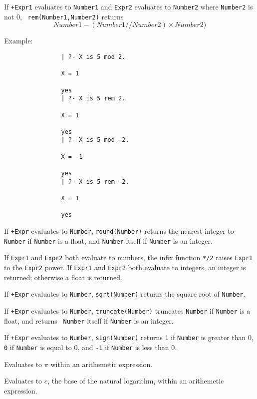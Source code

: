 \begin{description}
%
If {\tt +Expr1} evaluates to {\tt Number1} and {\tt Expr2} evaluates
to {\tt Number2} where {\tt Number2} is not 0, {\tt
rem(Number1,Number2)} returns
\[
	Number1 - ({Number1} // {Number2}) \times Number2)
\]

    Example:
    {\footnotesize
     \begin{verbatim}
                | ?- X is 5 mod 2.

                X = 1

                yes
                | ?- X is 5 rem 2.

                X = 1

                yes
                | ?- X is 5 mod -2.

                X = -1

                yes
                | ?- X is 5 rem -2.

                X = 1

                yes
  \end{verbatim}}

%
If {\tt +Expr} evaluates to {\tt Number}, {\tt round(Number)} returns
the nearest integer to {\tt Number} if {\tt Number} is a float, and
{\tt Number} itself if {\tt Number} is an integer.

%
If {\tt Expr1} and {\tt Expr2} both evaluate to numbers, the infix
function {\tt **/2} raises {\tt Expr1} to the {\tt Expr2} power.  If
{\tt Expr1} and {\tt Expr2} both evaluate to integers, an integer is
returned; otherwise a float is returned.

%
If {\tt +Expr} evaluates to {\tt Number}, {\tt sqrt(Number)}
returns the square root of {\tt Number}.

%
If {\tt +Expr} evaluates to {\tt Number}, {\tt truncate(Number)}
truncates {\tt Number} if {\tt Number} is a float, and returns {\tt
  Number} itself if {\tt Number} is an integer.

%
If {\tt +Expr} evaluates to {\tt Number}, {\tt sign(Number)} returns
{\tt 1} if {\tt Number} is greater than 0, {\tt 0} if {\tt Number} is
equal to 0, and {\tt -1} if {\tt Number} is less than 0.

% 
Evaluates to $\pi$ within an arithemetic expression.

% 
Evaluates to $e$, the base of the natural logarithm, within an
arithemetic expression.

\end{description}

